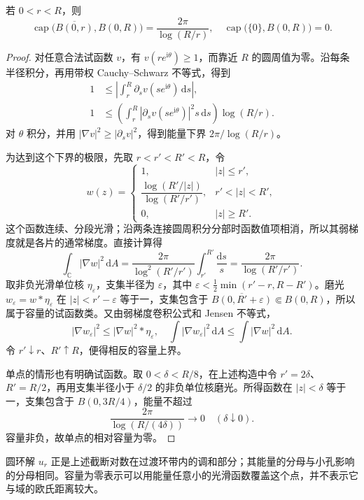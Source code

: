 \begin{proposition}[圆盘的相对容量]\label{b3:prop:16-annulus-capacity}
若 \(0<r<R\)，则
\[
 \operatorname{cap}\bigl(\overline{B(0,r)},B(0,R)\bigr)
 =\frac{2\pi}{\log(R/r)},
 \quad
 \operatorname{cap}\bigl(\{0\},B(0,R)\bigr)=0.
\]
\end{proposition}
\begin{proof}
对任意合法试函数 \(v\)，有 \(v(re^{\mathrm{i}\theta})\ge1\)，而靠近 \(R\) 的圆周值为零。沿每条半径积分，再用带权 Cauchy--Schwarz 不等式，得到
\[
 \begin{aligned}
 1&\le\left|\int_r^R\partial_s v(se^{\mathrm{i}\theta})\,\mathrm{d}s\right|,\\
 1&\le\left(\int_r^R|\partial_s v(se^{\mathrm{i}\theta})|^2s\,\mathrm{d}s\right)
           \log(R/r).
 \end{aligned}
\]
对 \(\theta\) 积分，并用 \(|\nabla v|^2\ge|\partial_s v|^2\)，得到能量下界 \(2\pi/\log(R/r)\)。

为达到这个下界的极限，先取 \(r<r'<R'<R\)，令
\[
 w(z)=
 \begin{cases}
 1,&|z|\le r',\\
 \dfrac{\log(R'/|z|)}{\log(R'/r')},&r'<|z|<R',\\
 0,&|z|\ge R'.
 \end{cases}
\]
这个函数连续、分段光滑；沿两条连接圆周积分分部时函数值项相消，所以其弱梯度就是各片的通常梯度。直接计算得
\[
 \int_{\mathbb C}|\nabla w|^2\,\mathrm{d}A
 =\frac{2\pi}{\log^2(R'/r')}\int_{r'}^{R'}\frac{\mathrm{d}s}{s}
 =\frac{2\pi}{\log(R'/r')}.
\]
取非负光滑单位核 \(\eta_\varepsilon\)，支集半径为 \(\varepsilon\)，其中
\(\varepsilon<\tfrac12\min(r'-r,R-R')\)。磨光 \(w_\varepsilon=w*\eta_\varepsilon\) 在 \(|z|<r'-\varepsilon\) 等于一，支集包含于 \(\overline{B(0,R'+\varepsilon)}\Subset B(0,R)\)，所以属于容量的试函数类。又由弱梯度卷积公式和 Jensen 不等式，
\[
 |\nabla w_\varepsilon|^2
 \le |\nabla w|^2*\eta_\varepsilon,
 \quad
 \int|\nabla w_\varepsilon|^2\,\mathrm{d}A
 \le\int|\nabla w|^2\,\mathrm{d}A.
\]
令 \(r'\downarrow r\)、\(R'\uparrow R\)，便得相反的容量上界。

单点的情形也有明确试函数。取 \(0<\delta<R/8\)，在上述构造中令 \(r'=2\delta\)、\(R'=R/2\)，再用支集半径小于 \(\delta/2\) 的非负单位核磨光。所得函数在 \(|z|<\delta\) 等于一，支集包含于 \(B(0,3R/4)\)，能量不超过
\[
 \frac{2\pi}{\log(R/(4\delta))}\longrightarrow0
 \quad(\delta\downarrow0).
\]
容量非负，故单点的相对容量为零。
\end{proof}
圆环解 \(u_r\) 正是上述截断对数在过渡环带内的调和部分；其能量的分母与小孔影响的分母相同。容量为零表示可以用能量任意小的光滑函数覆盖这个点，并不表示它与域的欧氏距离较大。

